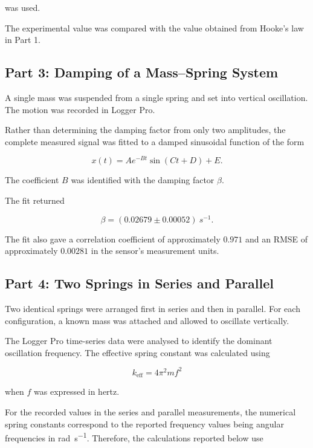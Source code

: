 \documentclass[12pt,a4paper]{article}
\begin{document}
was used.

The experimental value was compared with the value obtained from Hooke's law in Part 1.

\subsection{Part 3: Damping of a Mass--Spring System}

A single mass was suspended from a single spring and set into vertical oscillation. The motion was recorded in Logger Pro.

Rather than determining the damping factor from only two amplitudes, the complete measured signal was fitted to a damped sinusoidal function of the form

\begin{equation}
x(t)=Ae^{-Bt}\sin(Ct+D)+E.
\end{equation}

The coefficient $B$ was identified with the damping factor $\beta$.

The fit returned

\begin{equation}
\beta=(0.02679\pm0.00052)\ \si{s^{-1}}.
\end{equation}

The fit also gave a correlation coefficient of approximately $0.971$ and an RMSE of approximately $0.00281$ in the sensor's measurement units.

\subsection{Part 4: Two Springs in Series and Parallel}

Two identical springs were arranged first in series and then in parallel. For each configuration, a known mass was attached and allowed to oscillate vertically.

The Logger Pro time-series data were analysed to identify the dominant oscillation frequency. The effective spring constant was calculated using

\begin{equation}
k_{\mathrm{eff}}=4\pi^2mf^2
\end{equation}

when $f$ was expressed in hertz.

For the recorded values in the series and parallel measurements, the numerical spring constants correspond to the reported frequency values being angular frequencies in \si{rad.s^{-1}}. Therefore, the calculations reported below use
\end{document}
